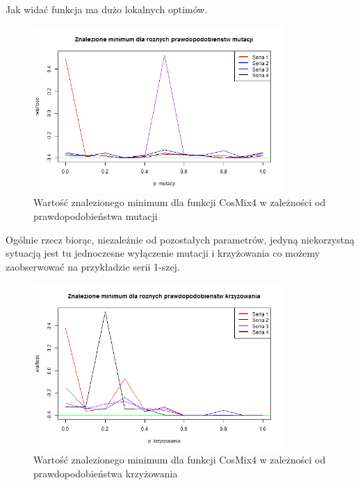 \documentclass[11pt, a4paper]{article}
\newcommand{\fbi}{\leavevmode{\parindent=1em\indent}}
\begin{document}
\fbi
Jak widać funkcja ma dużo lokalnych optimów.

\begin{figure}[H]
	\begin{center}
		\includegraphics[width=0.85\textwidth]{./assets/CosMix42.png}
		\caption{Wartość znalezionego minimum dla funkcji CosMix4 w zależności od prawdopodobieństwa mutacji}
		\label{fig:cosmix42}
	\end{center}
\end{figure}

\fbi
Ogólnie rzecz biorąc, niezależnie od pozostałych parametrów, jedyną niekorzystną sytuacją jest tu jednoczesne wyłączenie mutacji i krzyżowania co możemy zaobserwować na przykładzie serii 1-szej.

\begin{figure}[H]
	\begin{center}
		\includegraphics[width=0.85\textwidth]{./assets/CosMix43.png}
		\caption{Wartość znalezionego minimum dla funkcji CosMix4 w zależności od prawdopodobieństwa krzyżowania}
		\label{fig:cosmix43}
	\end{center}
\end{figure}
\end{document}
